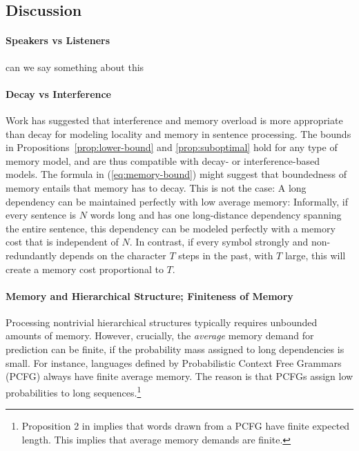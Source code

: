 \subsection{Discussion}


\paragraph{Speakers vs Listeners}
can we say something about this

\paragraph{Decay vs Interference}
Work has suggested that interference and memory overload is more appropriate than decay \cite[p. 408]{lewis-activation-based-2005} for modeling locality and memory in sentence processing.
The bounds in Propositions~\ref{prop:lower-bound} and \ref{prop:suboptimal} hold for any type of memory model, and are thus compatible with decay- or interference-based models.
The formula in (\ref{eq:memory-bound}) might suggest that boundedness of memory entails that memory has to decay.
This is not the case:
A long dependency can be maintained perfectly with low average memory:
Informally, if every sentence is $N$ words long and has one long-distance dependency spanning the entire sentence, this dependency can be modeled perfectly with a memory cost that is independent of $N$.
In contrast, if every symbol strongly and non-redundantly depends on the character $T$ steps in the past, with $T$ large, this will create a memory cost proportional to $T$.




\paragraph{Memory and Hierarchical Structure; Finiteness of Memory}
Processing nontrivial hierarchical structures typically requires unbounded amounts of memory.
However, crucially, the \emph{average} memory demand for prediction can be finite, if the probability mass assigned to long dependencies is small.
For instance, languages defined by Probabilistic Context Free Grammars (PCFG) always have finite average memory.
The reason is that PCFGs assign low probabilities to long sequences.\footnote{Proposition 2 in \cite{chi-statistical-1999} implies that words drawn from a PCFG have finite expected length. This implies that average memory demands are finite.}




